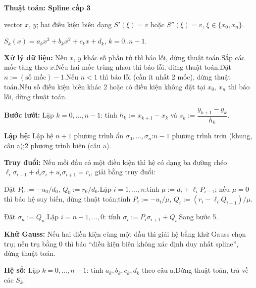\documentclass[11pt,a4paper]{article}
\newenvironment{thuattoan}[1]
  {\par\medskip\noindent\textbf{Thuật toán: #1}\begin{description}[style=standard,align=left,leftmargin=4.3em,labelwidth=3.9em,labelsep=0.4em,itemsep=1pt,topsep=3pt,font=\normalfont\bfseries]}
  {\end{description}}
\newenvironment{con}
  {\begin{description}[style=standard,align=left,leftmargin=2.1em,labelwidth=1.8em,labelsep=0.3em,itemsep=0pt,topsep=1pt,font=\normalfont]}
  {\end{description}}
\newcommand{\thut}{\newline\hspace*{1.2em}}
\begin{document}
\begin{thuattoan}{Spline cấp 3}
\item[Input:] vector $x$, $y$; hai điều kiện biên dạng $S'(\xi)=v$ hoặc $S''(\xi)=v$, $\xi\in\{x_0,x_n\}$.
\item[Output:] $S_k(x)=a_kx^3+b_kx^2+c_kx+d_k$, $k=0..n-1$.
\item[Bước 0:] \textbf{Xử lý dữ liệu:} Nếu $x$, $y$ khác số phần tử thì báo lỗi, dừng thuật toán.\newline Sắp các mốc tăng theo $x$.\newline Nếu hai mốc trùng nhau thì báo lỗi, dừng thuật toán.\newline Đặt $n:=(\text{số mốc})-1$.\newline Nếu $n<1$ thì báo lỗi (cần ít nhất 2 mốc), dừng thuật toán.\newline Nếu số điều kiện biên khác $2$ hoặc có điều kiện không đặt tại $x_0$, $x_n$ thì báo lỗi, dừng thuật toán.
\item[Bước 1:] \textbf{Bước lưới:} Lặp $k=0,\dots,n-1$: tính $h_k:=x_{k+1}-x_k$ và $s_k:=\dfrac{y_{k+1}-y_k}{h_k}$.
\item[Bước 2:] \textbf{Lập hệ:} Lập hệ $n+1$ phương trình ẩn $\sigma_0,\dots,\sigma_n$:\thut $n-1$ phương trình trơn (khung, câu a);\thut 2 phương trình biên (câu a).
\item[Bước 3:] \textbf{Truy đuổi:} Nếu mỗi đầu có một điều kiện thì hệ có dạng ba đường chéo $\ell_i\sigma_{i-1}+d_i\sigma_i+u_i\sigma_{i+1}=r_i$, giải bằng truy đuổi:
  \begin{con}
  \item[3.1:] Đặt $P_0:=-u_0/d_0$, $Q_0:=r_0/d_0$.\newline Lặp $i=1,\dots,n$:\thut tính $\mu:=d_i+\ell_iP_{i-1}$; nếu $\mu=0$ thì báo hệ suy biến, dừng thuật toán;\thut tính $P_i:=-u_i/\mu$, $Q_i:=(r_i-\ell_iQ_{i-1})/\mu$.
  \item[3.2:] Đặt $\sigma_n:=Q_n$.\newline Lặp $i=n-1,\dots,0$: tính $\sigma_i:=P_i\sigma_{i+1}+Q_i$.\newline Sang bước 5.
  \end{con}
\item[Bước 4:] \textbf{Khử Gauss:} Nếu hai điều kiện cùng một đầu thì giải hệ bằng khử Gauss chọn trụ; nếu trụ bằng $0$ thì báo ``điều kiện biên không xác định duy nhất spline'', dừng thuật toán.
\item[Bước 5:] \textbf{Hệ số:} Lặp $k=0,\dots,n-1$: tính $a_k,b_k,c_k,d_k$ theo câu a.\newline Dừng thuật toán, trả về các $S_k$.
\end{thuattoan}
\end{document}
